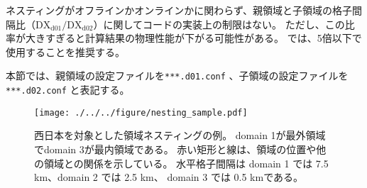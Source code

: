 ネスティングがオフラインかオンラインかに関わらず、親領域と子領域の格子間隔比（$\mathrm{DX}_{\mathrm{d01}}/\mathrm{DX}_{\mathrm{d02}}$）に関してコードの実装上の制限はない。
ただし、この比率が大きすぎると計算結果の物理性能が下がる可能性がある。
\scalerm では、5倍以下で使用することを推奨する。

本節では、親領域の設定ファイルを\verb|***.d01.conf| 、子領域の設定ファイルを\verb|***.d02.conf| と表記する。

\begin{figure}[t]
\begin{center}
  \texttt{[image: ./../../figure/nesting\_sample.pdf]}\\
  \caption{西日本を対象とした領域ネスティングの例。
    domain 1が最外領域でdomain 3が最内領域である。
    赤い矩形と線は、領域の位置や他の領域との関係を示している。
    水平格子間隔は domain 1 では 7.5 km、domain 2 では 2.5 km、
    domain 3 では 0.5 kmである。}
  \label{fig_nestsample}
\end{center}
\end{figure}
